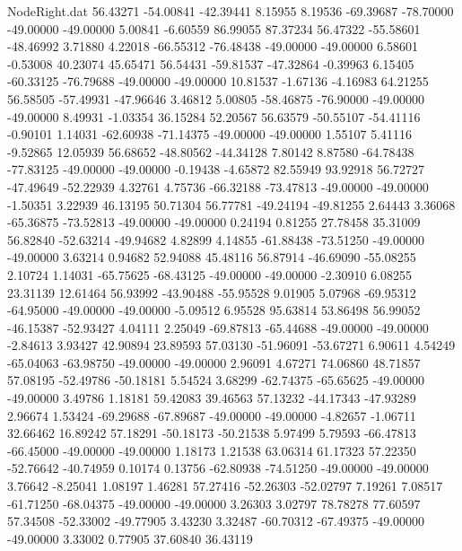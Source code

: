 \begin{filecontents}{NodeRight.dat}
  56.43271  -54.00841  -42.39441     8.15955    8.19536  -69.39687  -78.70000  -49.00000  -49.00000    5.00841   -6.60559   86.99055   87.37234
  56.47322  -55.58601  -48.46992     3.71880    4.22018  -66.55312  -76.48438  -49.00000  -49.00000    6.58601   -0.53008   40.23074   45.65471
  56.54431  -59.81537  -47.32864    -0.39963    6.15405  -60.33125  -76.79688  -49.00000  -49.00000   10.81537   -1.67136   -4.16983   64.21255
  56.58505  -57.49931  -47.96646     3.46812    5.00805  -58.46875  -76.90000  -49.00000  -49.00000    8.49931   -1.03354   36.15284   52.20567
  56.63579  -50.55107  -54.41116    -0.90101    1.14031  -62.60938  -71.14375  -49.00000  -49.00000    1.55107    5.41116   -9.52865   12.05939
  56.68652  -48.80562  -44.34128     7.80142    8.87580  -64.78438  -77.83125  -49.00000  -49.00000   -0.19438   -4.65872   82.55949   93.92918
  56.72727  -47.49649  -52.22939     4.32761    4.75736  -66.32188  -73.47813  -49.00000  -49.00000   -1.50351    3.22939   46.13195   50.71304
  56.77781  -49.24194  -49.81255     2.64443    3.36068  -65.36875  -73.52813  -49.00000  -49.00000    0.24194    0.81255   27.78458   35.31009
  56.82840  -52.63214  -49.94682     4.82899    4.14855  -61.88438  -73.51250  -49.00000  -49.00000    3.63214    0.94682   52.94088   45.48116
  56.87914  -46.69090  -55.08255     2.10724    1.14031  -65.75625  -68.43125  -49.00000  -49.00000   -2.30910    6.08255   23.31139   12.61464
  56.93992  -43.90488  -55.95528     9.01905    5.07968  -69.95312  -64.95000  -49.00000  -49.00000   -5.09512    6.95528   95.63814   53.86498
  56.99052  -46.15387  -52.93427     4.04111    2.25049  -69.87813  -65.44688  -49.00000  -49.00000   -2.84613    3.93427   42.90894   23.89593
  57.03130  -51.96091  -53.67271     6.90611    4.54249  -65.04063  -63.98750  -49.00000  -49.00000    2.96091    4.67271   74.06860   48.71857
  57.08195  -52.49786  -50.18181     5.54524    3.68299  -62.74375  -65.65625  -49.00000  -49.00000    3.49786    1.18181   59.42083   39.46563
  57.13232  -44.17343  -47.93289     2.96674    1.53424  -69.29688  -67.89687  -49.00000  -49.00000   -4.82657   -1.06711   32.66462   16.89242
  57.18291  -50.18173  -50.21538     5.97499    5.79593  -66.47813  -66.45000  -49.00000  -49.00000    1.18173    1.21538   63.06314   61.17323
  57.22350  -52.76642  -40.74959     0.10174    0.13756  -62.80938  -74.51250  -49.00000  -49.00000    3.76642   -8.25041    1.08197    1.46281
  57.27416  -52.26303  -52.02797     7.19261    7.08517  -61.71250  -68.04375  -49.00000  -49.00000    3.26303    3.02797   78.78278   77.60597
  57.34508  -52.33002  -49.77905     3.43230    3.32487  -60.70312  -67.49375  -49.00000  -49.00000    3.33002    0.77905   37.60840   36.43119

\end{filecontents}
